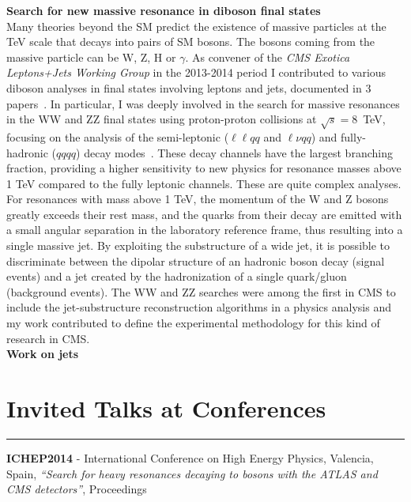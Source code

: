 \documentclass[10pt, a4paper]{article}
\newcommand{\years}[1]{\marginnote{\hskip-0.2in{\small #1}}}
\begin{document}
{\bf Search for new massive resonance in diboson final states} \\[0.5em]
Many theories beyond the SM predict the existence of massive particles
at the TeV scale that decays into pairs of SM bosons. The bosons
coming from the massive particle can be W, Z, H or $\gamma$. 
As convener of the {\it CMS Exotica Leptons+Jets Working
Group} in the 2013-2014 period I contributed to various diboson
analyses in final states involving leptons and jets, documented in 
3 papers~\cite{Khachatryan:2015ywa,Khachatryan:2014gha,CMS:2015neg}.
In particular, I was deeply involved in the search for massive resonances in the WW and ZZ 
final states using proton-proton collisions at $\sqrt{s}=8$~TeV, focusing
on the analysis of the semi-leptonic ($\ell\ell qq$ and $\ell\nu qq$) 
and fully-hadronic ($qqqq$) decay modes~\cite{Khachatryan:2014gha}.
These decay channels have the largest branching fraction, providing
a higher sensitivity to new physics for resonance masses above 1 TeV
compared to the fully leptonic channels.
These are quite complex analyses. For resonances with mass above 1 TeV, the momentum of the W and Z
bosons greatly exceeds their rest mass, and the quarks from their decay
are emitted with a small angular separation in the laboratory
reference frame, thus resulting into a single massive jet.  
By exploiting the substructure of a wide jet, it is possible to
discriminate between the dipolar structure of an hadronic boson decay (signal events)
and a jet created by the hadronization of a single quark/gluon (background events).
The WW and ZZ searches were among the first in CMS to include the
jet-substructure reconstruction algorithms in a physics analysis and
my work contributed to define the experimental
methodology for this kind of research in CMS. \\ [1em]


{\bf Work on jets} \\ [1em]



\section*{Invited Talks at Conferences}
\vspace{-5pt}
\hrule
\vspace{10pt}
\years{07/2014}\textbf{ICHEP2014} - International Conference on High Energy Physics, Valencia, Spain, \textit{``Search for heavy resonances decaying to bosons with the ATLAS and CMS detectors''}, Proceedings~\cite{Santanastasio:ICHEP2014} \\ [1em]  
\end{document}
